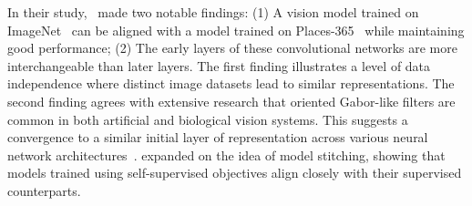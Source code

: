 \documentclass{article}
\theoremstyle{plain}
\theoremstyle{definition}
\theoremstyle{remark}
\begin{document}


In their study,~\citet{lenc2015understanding} made two notable findings: (1) A vision model trained on ImageNet~\cite{russakovsky2015imagenet} can be aligned with a model trained on Places-365~\citep{zhou2017places} while maintaining good performance; (2) The early layers of these convolutional networks are more interchangeable than later layers. The first finding illustrates a level of data independence where distinct image datasets lead to similar representations. The second finding agrees with extensive research that oriented Gabor-like filters are common in both artificial and biological vision systems. This suggests a convergence to a similar initial layer of representation across various neural network architectures~\citep{olshausen1996emergence, krizhevsky2017imagenet}.
\citet{bansal2021revisiting} expanded on the idea of model stitching, showing that models trained using self-supervised objectives align closely with their supervised counterparts.



\end{document}
